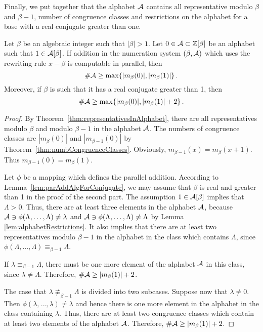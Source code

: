 Finally, we put together that the alphabet $\mathcal{A}$ contains all representative modulo $\beta$ and $\beta-1$, number of congruence classes and restrictions on the alphabet for a base with a real conjugate greater than one.
\begin{thm}
Let $\beta$ be an algebraic integer such that $|\beta|>1$. Let $0\in \mathcal{A}\subset \mathbb{Z}[\beta]$ be an alphabet such that $1\in \mathcal{A}[\beta]$. If addition in the numeration system $(\beta, \mathcal{A})$ which uses the rewriting rule $x-\beta$ is computable in parallel, then
$$
\#\mathcal{A} \geq \max \{|m_\beta(0)|, |m_\beta(1)|\}\,.
$$
Moreover, if $\beta$ is such that it has a real conjugate greater than 1, then 
$$
\#\mathcal{A} \geq \max \{|m_\beta(0)|, |m_\beta(1)|+2\}\,.
$$
\end{thm}
\begin{proof}
By Theorem~\ref{thm:representativesInAlphabet}, there are all representatives modulo $\beta$ and modulo $\beta-1$ in the alphabet $\mathcal{A}$. The numbers of congruence classes are $|m_\beta(0)|$ and $|m_{\beta-1}(0)|$ by Theorem~\ref{thm:numbCongruenceClasses}. Obviously, $m_{\beta-1}(x) = m_\beta (x+1)$. Thus $m_{\beta-1}(0) = m_\beta (1)$.

Let $\phi$ be a mapping which defines the parallel addition. According to Lemma~\ref{lem:parAddAlgForConjugate}, we may assume that $\beta$ is real and greater than 1 in the proof of the second part. The assumption $1\in \mathcal{A}[\beta]$ implies that $\Lambda>0$. Thus, there are at least three elements in the alphabet $\mathcal{A}$, because $\mathcal{A}\ni\phi(\Lambda,\dots,\Lambda)\neq \lambda$ and $\mathcal{A}\ni\phi(\Lambda,\dots,\Lambda)\neq \Lambda$ by Lemma \ref{lem:alphabetRestrictions}. It also implies that there are at least two representatives modulo $\beta-1$ in the alphabet in the class which contains $\Lambda$, since $\phi(\Lambda,\dots,\Lambda)\equiv_{\beta-1} \Lambda$.  

If $\lambda\equiv_{\beta-1}\Lambda$, there must be one more element of the alphabet $\mathcal{A}$ in this class, since $\lambda \neq \Lambda$. Therefore, $\#\mathcal{A}\geq |m_\beta(1)|+2$. 

The case that $\lambda\not\equiv_{\beta-1}\Lambda$ is divided into two subcases. Suppose now that $\lambda\neq 0$. Then $\phi(\lambda,\dots,\lambda)\neq \lambda$ and hence there is one more element in the alphabet in the class containing $\lambda$. Thus, there are at least two congruence classes which contain at least two elements of the alphabet $\mathcal{A}$. Therefore, $\#\mathcal{A}\geq |m_\beta(1)|+2$.


\end{proof}
